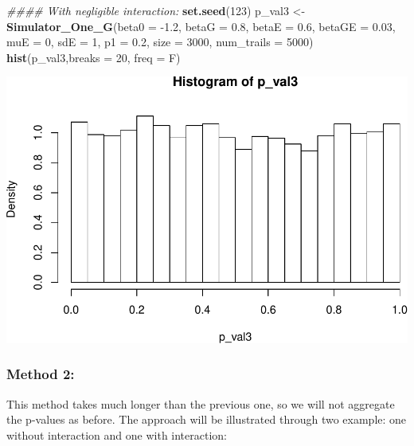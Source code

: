 \documentclass[]{article}
\newenvironment{Shaded}{\begin{snugshade}}{\end{snugshade}}
\newcommand{\CommentTok}[1]{\textcolor[rgb]{0.56,0.35,0.01}{\textit{#1}}}
\newcommand{\DataTypeTok}[1]{\textcolor[rgb]{0.13,0.29,0.53}{#1}}
\newcommand{\DecValTok}[1]{\textcolor[rgb]{0.00,0.00,0.81}{#1}}
\newcommand{\FloatTok}[1]{\textcolor[rgb]{0.00,0.00,0.81}{#1}}
\newcommand{\KeywordTok}[1]{\textcolor[rgb]{0.13,0.29,0.53}{\textbf{#1}}}
\newcommand{\NormalTok}[1]{#1}
\newcommand{\StringTok}[1]{\textcolor[rgb]{0.31,0.60,0.02}{#1}}
\begin{document}
\begin{Shaded}
\begin{Highlighting}[]
\CommentTok{#### With negligible interaction:}
\KeywordTok{set.seed}\NormalTok{(}\DecValTok{123}\NormalTok{)}
\NormalTok{p_val3 <-}\StringTok{ }\KeywordTok{Simulator_One_G}\NormalTok{(}\DataTypeTok{beta0 =} \FloatTok{-1.2}\NormalTok{, }\DataTypeTok{betaG =} \FloatTok{0.8}\NormalTok{, }\DataTypeTok{betaE =} \FloatTok{0.6}\NormalTok{, }\DataTypeTok{betaGE =} \FloatTok{0.03}\NormalTok{, }\DataTypeTok{muE =} \DecValTok{0}\NormalTok{, }\DataTypeTok{sdE =} \DecValTok{1}\NormalTok{, }\DataTypeTok{p1 =} \FloatTok{0.2}\NormalTok{, }\DataTypeTok{size =} \DecValTok{3000}\NormalTok{, }\DataTypeTok{num_trails =} \DecValTok{5000}\NormalTok{)}
\KeywordTok{hist}\NormalTok{(p_val3,}\DataTypeTok{breaks =} \DecValTok{20}\NormalTok{, }\DataTypeTok{freq =}\NormalTok{ F)}
\end{Highlighting}
\end{Shaded}

\includegraphics{stats-gene-research-progress-v3_files/figure-latex/unnamed-chunk-1-4.pdf}

\hypertarget{method-2}{%
\subsubsection{Method 2:}\label{method-2}}

This method takes much longer than the previous one, so we will not
aggregate the p-values as before. The approach will be illustrated
through two example: one without interaction and one with interaction:
\end{document}
